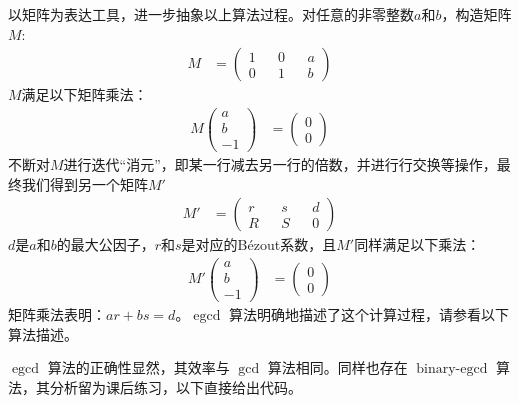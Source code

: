 以矩阵为表达工具，进一步抽象以上算法过程。对任意的非零整数$a$和$b$，构造矩阵$M$:
\begin{align}
M &=
\begin{pmatrix} 
1 && 0 && a\\
0 && 1 && b
\end{pmatrix}
\end{align}
$M$满足以下矩阵乘法：
\begin{align}
M
\begin{pmatrix} 
	 a\\
	b\\
	-1
\end{pmatrix}
&=
\begin{pmatrix} 
0\\
0
\end{pmatrix}
\end{align}
不断对$M$进行迭代“消元”，即某一行减去另一行的倍数，并进行行交换等操作，最终我们得到另一个矩阵$M'$
\begin{align}
M' &=
\begin{pmatrix} 
r && s && d\\
R && S && 0
\end{pmatrix}
\end{align}
$d$是$a$和$b$的最大公因子，$r$和$s$是对应的B\'{e}zout系数，且$M'$同样满足以下乘法：
\begin{align}
M'
\begin{pmatrix} 
a\\
b\\
-1
\end{pmatrix}
&=
\begin{pmatrix} 
0\\
0
\end{pmatrix}
\end{align}
矩阵乘法表明：$ar + bs = d$。$\operatorname{egcd}$ 算法明确地描述了这个计算过程，请参看以下算法描述。

\begin{center}
	
\end{center}

$\operatorname{egcd}$ 算法的正确性显然，其效率与 $\gcd$ 算法相同。同样也存在 $\operatorname{binary-egcd}$ 算法，其分析留为课后练习，以下直接给出代码。
\begin{center}
	
\end{center}

